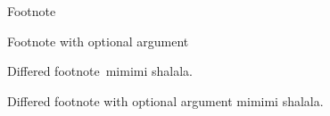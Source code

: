 \documentclass[]{book}
\begin{document}
Footnote

Footnote with optional argument

Differed footnote\footnoteAmark\ mimimi shalala.


Differed footnote with optional argument
\footnoteAmark[42] mimimi shalala.
\end{document}
